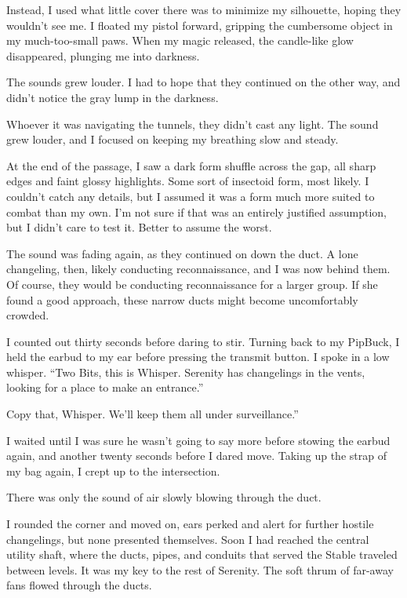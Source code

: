 Instead, I used what little cover there was to minimize my silhouette, hoping they wouldn’t see me. I floated my pistol forward, gripping the cumbersome object in my much-too-small paws. When my magic released, the candle-like glow disappeared, plunging me into darkness.

The sounds grew louder. I had to hope that they continued on the other way, and didn’t notice the gray lump in the darkness.

Whoever it was navigating the tunnels, they didn’t cast any light. The sound grew louder, and I focused on keeping my breathing slow and steady.

At the end of the passage, I saw a dark form shuffle across the gap, all sharp edges and faint glossy highlights. Some sort of insectoid form, most likely. I couldn’t catch any details, but I assumed it was a form much more suited to combat than my own. I’m not sure if that was an entirely justified assumption, but I didn’t care to test it. Better to assume the worst.

The sound was fading again, as they continued on down the duct. A lone changeling, then, likely conducting reconnaissance, and I was now behind them. Of course, they would be conducting reconnaissance for a larger group. If she found a good approach, these narrow ducts might become uncomfortably crowded.

I counted out thirty seconds before daring to stir. Turning back to my PipBuck, I held the earbud to my ear before pressing the transmit button. I spoke in a low whisper. “Two Bits, this is Whisper. Serenity has changelings in the vents, looking for a place to make an entrance.”

\leavevmode{}Copy that, Whisper. We’ll keep them all under surveillance.”

I waited until I was sure he wasn’t going to say more before stowing the earbud again, and another twenty seconds before I dared move. Taking up the strap of my bag again, I crept up to the intersection.

There was only the sound of air slowly blowing through the duct.

I rounded the corner and moved on, ears perked and alert for further hostile changelings, but none presented themselves. Soon I had reached the central utility shaft, where the ducts, pipes, and conduits that served the Stable traveled between levels. It was my key to the rest of Serenity. The soft thrum of far-away fans flowed through the ducts.

